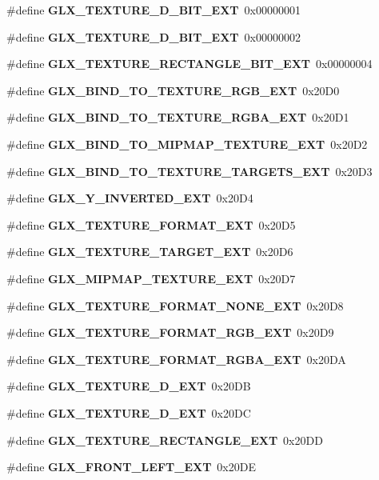 \begin{DoxyCompactItemize}
\#define {\bf G\+L\+X\+\_\+\+T\+E\+X\+T\+U\+R\+E\+\_\+D\+\_\+\+B\+I\+T\+\_\+\+E\+XT}~0x00000001
\item 
\#define {\bf G\+L\+X\+\_\+\+T\+E\+X\+T\+U\+R\+E\+\_\+D\+\_\+\+B\+I\+T\+\_\+\+E\+XT}~0x00000002
\item 
\#define {\bf G\+L\+X\+\_\+\+T\+E\+X\+T\+U\+R\+E\+\_\+\+R\+E\+C\+T\+A\+N\+G\+L\+E\+\_\+\+B\+I\+T\+\_\+\+E\+XT}~0x00000004
\item 
\#define {\bf G\+L\+X\+\_\+\+B\+I\+N\+D\+\_\+\+T\+O\+\_\+\+T\+E\+X\+T\+U\+R\+E\+\_\+\+R\+G\+B\+\_\+\+E\+XT}~0x20\+D0
\item 
\#define {\bf G\+L\+X\+\_\+\+B\+I\+N\+D\+\_\+\+T\+O\+\_\+\+T\+E\+X\+T\+U\+R\+E\+\_\+\+R\+G\+B\+A\+\_\+\+E\+XT}~0x20\+D1
\item 
\#define {\bf G\+L\+X\+\_\+\+B\+I\+N\+D\+\_\+\+T\+O\+\_\+\+M\+I\+P\+M\+A\+P\+\_\+\+T\+E\+X\+T\+U\+R\+E\+\_\+\+E\+XT}~0x20\+D2
\item 
\#define {\bf G\+L\+X\+\_\+\+B\+I\+N\+D\+\_\+\+T\+O\+\_\+\+T\+E\+X\+T\+U\+R\+E\+\_\+\+T\+A\+R\+G\+E\+T\+S\+\_\+\+E\+XT}~0x20\+D3
\item 
\#define {\bf G\+L\+X\+\_\+\+Y\+\_\+\+I\+N\+V\+E\+R\+T\+E\+D\+\_\+\+E\+XT}~0x20\+D4
\item 
\#define {\bf G\+L\+X\+\_\+\+T\+E\+X\+T\+U\+R\+E\+\_\+\+F\+O\+R\+M\+A\+T\+\_\+\+E\+XT}~0x20\+D5
\item 
\#define {\bf G\+L\+X\+\_\+\+T\+E\+X\+T\+U\+R\+E\+\_\+\+T\+A\+R\+G\+E\+T\+\_\+\+E\+XT}~0x20\+D6
\item 
\#define {\bf G\+L\+X\+\_\+\+M\+I\+P\+M\+A\+P\+\_\+\+T\+E\+X\+T\+U\+R\+E\+\_\+\+E\+XT}~0x20\+D7
\item 
\#define {\bf G\+L\+X\+\_\+\+T\+E\+X\+T\+U\+R\+E\+\_\+\+F\+O\+R\+M\+A\+T\+\_\+\+N\+O\+N\+E\+\_\+\+E\+XT}~0x20\+D8
\item 
\#define {\bf G\+L\+X\+\_\+\+T\+E\+X\+T\+U\+R\+E\+\_\+\+F\+O\+R\+M\+A\+T\+\_\+\+R\+G\+B\+\_\+\+E\+XT}~0x20\+D9
\item 
\#define {\bf G\+L\+X\+\_\+\+T\+E\+X\+T\+U\+R\+E\+\_\+\+F\+O\+R\+M\+A\+T\+\_\+\+R\+G\+B\+A\+\_\+\+E\+XT}~0x20\+DA
\item 
\#define {\bf G\+L\+X\+\_\+\+T\+E\+X\+T\+U\+R\+E\+\_\+D\+\_\+\+E\+XT}~0x20\+DB
\item 
\#define {\bf G\+L\+X\+\_\+\+T\+E\+X\+T\+U\+R\+E\+\_\+D\+\_\+\+E\+XT}~0x20\+DC
\item 
\#define {\bf G\+L\+X\+\_\+\+T\+E\+X\+T\+U\+R\+E\+\_\+\+R\+E\+C\+T\+A\+N\+G\+L\+E\+\_\+\+E\+XT}~0x20\+DD
\item 
\#define {\bf G\+L\+X\+\_\+\+F\+R\+O\+N\+T\+\_\+\+L\+E\+F\+T\+\_\+\+E\+XT}~0x20\+DE

\end{DoxyCompactItemize}
